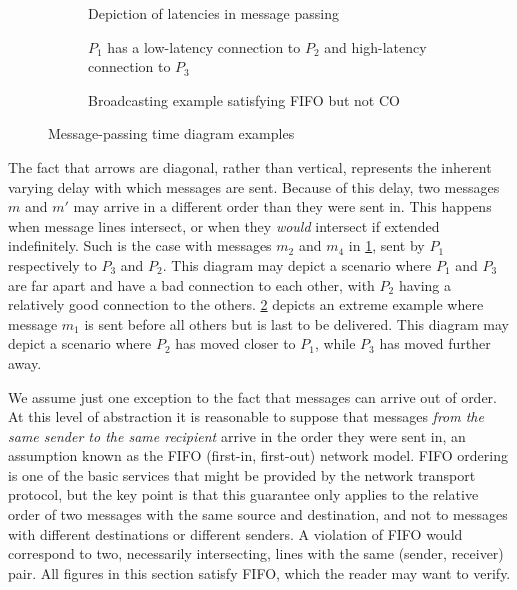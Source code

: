 \documentclass[]             %
{NASA}                       %
\theoremstyle{definition}
\begin{document}
\begin{figure}[p]
  \setlength\belowcaptionskip{5ex}

  \begin{subfigure}{1\textwidth}
    \centering
    
    \caption{Depiction of latencies in message passing}
    \label{fig:message-latencies-a}
  \end{subfigure}

  \begin{subfigure}{1\textwidth}
    \centering 
    \caption{$P_1$ has a low-latency connection to $P_2$ and high-latency connection to $P_3$}
    \label{fig:message-latencies-b}
  \end{subfigure}


  \begin{subfigure}{1\textwidth}
    \centering 
    \caption{Broadcasting example satisfying FIFO but not CO}
    \label{fig:message-latencies-c}
  \end{subfigure}

  \caption{Message-passing time diagram examples}
  \label{fig:message-latencies}
\end{figure}

\afterpage{\clearpage}

The fact that arrows are diagonal, rather than vertical, represents
the inherent varying delay with which messages are sent. Because of
this delay, two messages $m$ and $m'$ may arrive in a different order
than they were sent in. This happens when message lines intersect, or
when they \emph{would} intersect if extended indefinitely. Such is the
case with messages $m_2$ and $m_4$ in \ref{fig:message-latencies-a},
sent by $P_1$ respectively to $P_3$ and $P_2$. This diagram may depict
a scenario where $P_1$ and $P_3$ are far apart and have a bad
connection to each other, with $P_2$ having a relatively good
connection to the others. \ref{fig:message-latencies-b} depicts an
extreme example where message $m_1$ is sent before all others but is
last to be delivered. This diagram may depict a scenario where $P_2$
has moved closer to $P_1$, while $P_3$ has moved further away.

We assume just one exception to the fact that messages can arrive out
of order. At this level of abstraction it is reasonable to suppose
that messages \emph{from the same sender to the same recipient} arrive
in the order they were sent in, an assumption known as the FIFO
(first-in, first-out) network model. FIFO ordering is one of the basic
services that might be provided by the network transport protocol, but
the key point is that this guarantee only applies to the relative
order of two messages with the same source and destination, and not to
messages with different destinations or different senders. A violation
of FIFO would correspond to two, necessarily intersecting, lines with
the same (sender, receiver) pair. All figures in this section satisfy
FIFO, which the reader may want to verify.
\end{document}
